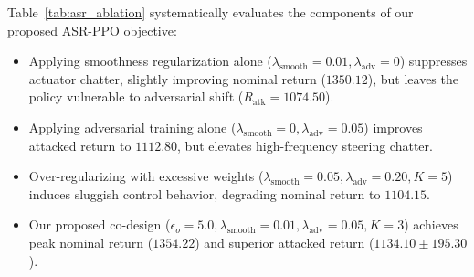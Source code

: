 \documentclass[conference]{IEEEtran}
\begin{document}
\begin{table}[!t]
\centering
\caption{Hyperparameter Sensitivity \& ASR-PPO Ablation Registry}
\label{tab:asr_ablation}
\end{table}

Table~\ref{tab:asr_ablation} systematically evaluates the components of our proposed ASR-PPO objective:
\begin{itemize}
    \item Applying smoothness regularization alone ($\lambda_{\text{smooth}} = 0.01, \lambda_{\text{adv}} = 0$) suppresses actuator chatter, slightly improving nominal return ($1350.12$), but leaves the policy vulnerable to adversarial shift ($R_{\text{atk}} = 1074.50$).
    \item Applying adversarial training alone ($\lambda_{\text{smooth}} = 0, \lambda_{\text{adv}} = 0.05$) improves attacked return to $1112.80$, but elevates high-frequency steering chatter.
    \item Over-regularizing with excessive weights ($\lambda_{\text{smooth}} = 0.05, \lambda_{\text{adv}} = 0.20, K=5$) induces sluggish control behavior, degrading nominal return to $1104.15$.
    \item Our proposed co-design ($\epsilon_o = 5.0, \lambda_{\text{smooth}} = 0.01, \lambda_{\text{adv}} = 0.05, K=3$) achieves peak nominal return ($1354.22$) and superior attacked return ($1134.10 \pm 195.30$).
\end{itemize}
\end{document}
